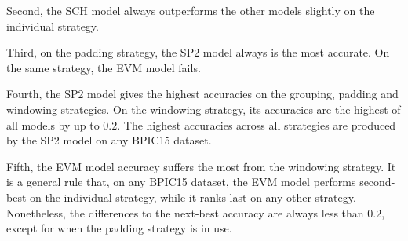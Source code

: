 Second, the SCH model always outperforms the other models slightly on the individual strategy.

Third, on the padding strategy, the SP2 model always is the most accurate.
On the same strategy, the EVM model fails.

Fourth, the SP2 model gives the highest accuracies on the grouping, padding and windowing strategies.
On the windowing strategy, its accuracies are the highest of all models by up to $0.2$.
The highest accuracies across all strategies are produced by the SP2 model on any BPIC15 dataset.

Fifth, the EVM model accuracy suffers the most from the windowing strategy.
It is a general rule that, on any BPIC15 dataset, the EVM model performs second-best on the individual strategy, while it ranks last on any other strategy.
Nonetheless, the differences to the next-best accuracy are always less than $0.2$, except for when the padding strategy is in use.

